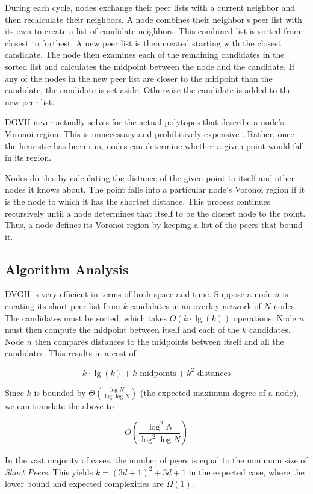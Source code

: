 During each cycle, nodes exchange their peer lists with a current neighbor and then recalculate their neighbors.
A node combines their neighbor's peer list with its own to create a list of candidate neighbors.
This combined list is sorted from closest to furthest.
A new peer list is then created starting with the closest candidate.
The node then examines each of the remaining candidates in the sorted list and calculates the midpoint between the node and the candidate.
If any of the nodes in the new peer list are closer to the midpoint than the candidate, the candidate is set aside.
Otherwise the candidate is added to the new peer list.


DGVH never actually solves for the actual polytopes that describe a node's Voronoi region.
This is unnecessary and prohibitively expensive \cite{raynet}.
Rather, once the heuristic has been run, nodes can determine whether a given point would fall in its region.

Nodes do this by calculating the distance of the given point to itself and other nodes it knows about.
The point falls into a particular node's Voronoi region if it is the node to which it has the shortest distance.
This process continues recursively until a node determines that itself to be the closest node to the point.
Thus, a node defines its Voronoi region by keeping a list of the peers that bound it.



\subsection{Algorithm Analysis}

DVGH is very efficient in terms of both space and time.
Suppose a node $n$ is creating its short peer list from $k$ candidates in an overlay network of $N$ nodes.
The candidates must be sorted, which takes $O(k\cdot\lg(k))$ operations.
Node $n$ must then compute the midpoint between itself and each of the $k$ candidates.
Node $n$ then compares distances to the midpoints between itself and all the candidates.
This results in a cost of

\[ k\cdot\lg(k) + k \text{ midpoints}  + k^{2} \text{ distances} \]


Since $k$ is  bounded by $\Theta(\frac{\log N}{\log \log N} )$ \cite{bern1991expected} (the expected maximum degree of a node), we can translate the above to

\[O(\frac{\log^{2} N}{\log^{2} \log N} )\]

In the vast majority of cases, the number of peers is equal to the minimum size of \textit{Short Peers}.
This yields $k=(3d+1)^{2}+3d+1$ in the expected case, where the lower bound and expected complexities are $\Omega(1)$.



